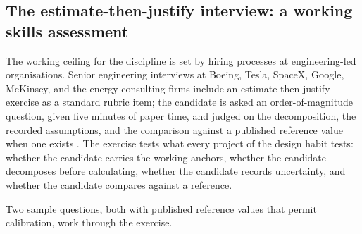 \subsection{The estimate-then-justify interview: a working
skills assessment}

The working ceiling for the discipline is set by hiring
processes at engineering-led organisations. Senior engineering
interviews at Boeing, Tesla, SpaceX, Google, McKinsey, and the
energy-consulting firms include an estimate-then-justify
exercise as a standard rubric item; the candidate is asked an
order-of-magnitude question, given five minutes of paper time,
and judged on the decomposition, the recorded assumptions, and
the comparison against a published reference value when one
exists \cite{text:ch09t3b-mcdowell-2015,
text:ch09t3b-marn-2014}. The exercise tests what every project
of the design habit tests: whether the candidate carries the
working anchors, whether the candidate decomposes before
calculating, whether the candidate records uncertainty, and
whether the candidate compares against a reference.

Two sample questions, both with published reference values that
permit calibration, work through the exercise.

